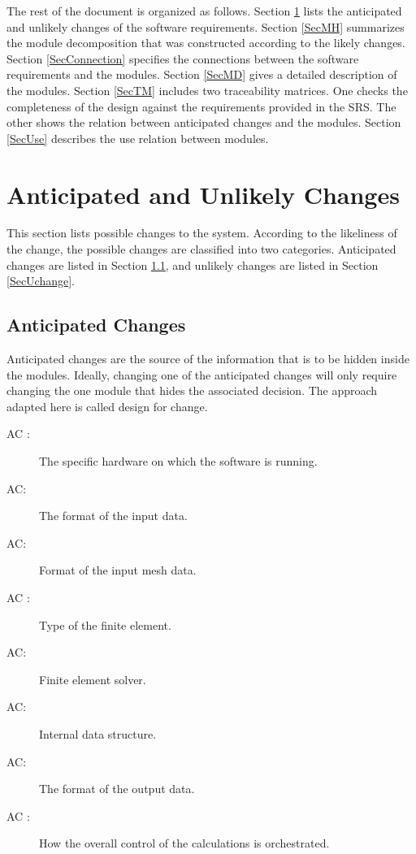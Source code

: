 \documentclass[12pt, titlepage]{article}
\newcounter{acnum} \newcommand{\actheacnum}{AC\theacnum}
\begin{document}
	The rest of the document is organized as follows. Section \ref{SecChange} lists
	the anticipated and unlikely changes of the software requirements. Section
	\ref{SecMH} summarizes the module decomposition that was constructed according
	to the likely changes. Section \ref{SecConnection} specifies the connections
	between the software requirements and the modules. Section \ref{SecMD} gives a
	detailed description of the modules. Section \ref{SecTM} includes two
	traceability matrices. One checks the completeness of the design against the
	requirements provided in the SRS. The other shows the relation between
	anticipated changes and the modules. Section \ref{SecUse} describes the use
	relation between modules.
	
	\section{Anticipated and Unlikely Changes} \label{SecChange}
	
	This section lists possible changes to the system. According to the likeliness
	of the change, the possible changes are classified into two categories.
	Anticipated changes are listed in Section \ref{SecAchange}, and unlikely changes
	are listed in Section \ref{SecUchange}.
	
	\subsection{Anticipated Changes} \label{SecAchange}
	
	Anticipated changes are the source of the information that is to be hidden
	inside the modules. Ideally, changing one of the anticipated changes will only
	require changing the one module that hides the associated decision. The approach
	adapted here is called design for change.
	
	\begin{description} \item[ \actheacnum
		\label{acHardware}:] The specific hardware on which the software is running.
		\item[ \actheacnum \label{acInput}:] The format of the
		input data. \item[ \actheacnum \label{acMeshIn}:] Format
		of the input mesh data. \item[ \actheacnum
		\label{acFiniteElement}:] Type of the finite element.
		\item[ \actheacnum \label{acFEM}:] Finite element solver.
		\item[ \actheacnum \label{acData}:] Internal data
		structure. \item[ \actheacnum \label{acOut}:] The format
		of the output data. \item[ \actheacnum
		\label{acSControl}:] How the overall control of the calculations is
		orchestrated.
		
		
	\end{description}
	
\end{document}

